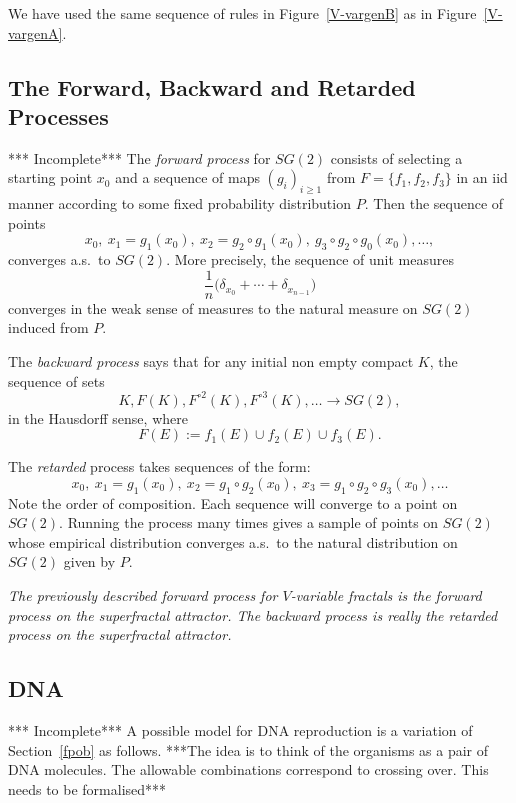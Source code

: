 \documentclass[a4paper]{amsart}
\theoremstyle{plain}
\theoremstyle{definition}
\theoremstyle{remark}
\begin{document}
We have used the same sequence of rules in Figure~\ref{V-vargenB} as in Figure~\ref{V-vargenA}.  

\subsection{The Forward, Backward and Retarded Processes}   *** Incomplete***   The \emph{forward process} for $ SG(2) $ consists of selecting a starting point $ x_0 $ and a sequence of maps $ (g_i)_{i\geq 1} $ from $ F=\{ f_1,f_2,f_3  \} $ in an iid manner according to some fixed probability distribution $ P $.  Then the sequence of points
\[
x_0,\  x_1=g_1(x_0),\  x_2 = g_2\circ g_1(x_0), \  g_3\circ g_2 \circ g_0 (x_0),                   \dots ,
\]
converges a.s.\  to $  SG(2) $.       
More precisely, the sequence of unit measures
\[
\frac{1}{n} \big(\delta_{x_0}+\cdots + \delta_{x_{n-1}}\big)
\]
converges in the weak sense of measures to the natural measure on $ SG(2) $ induced from $ P $.

The \emph{backward process} says that for any initial non empty compact $ K $, the sequence of sets
\[
K, F(K), F^{\circ 2}(K), F^{\circ 3}(K), \dots \to SG(2),\]
in the Hausdorff  sense, where 
\[ F(E) := f_1(E) \cup f_2(E) \cup f_3(E). \]

The \emph{retarded} process takes sequences of the form:
\[
x_0,  \  x_1 = g_1(x_0),\  x_2 = g_1\circ g_2(x_0),\  x_3 = g_1\circ g_2 \circ g_3 (x_0), \dots 
\]
Note the order of composition.  Each sequence will converge to a point on $ SG(2) $.  Running the process many times gives a sample of points on $ SG(2) $ whose empirical distribution converges a.s.\ to the natural distribution on $ SG(2) $ given by $ P $.


\bigskip
\emph{The previously described forward process for $ V $-variable fractals is the forward process on the superfractal attractor.   The backward process is really  the retarded process on the superfractal attractor.}



\subsection{DNA}   *** Incomplete*** A possible model for DNA reproduction is a variation of Section~\ref{fpob} as follows.   ***The idea is to think of the organisms as a pair of DNA molecules.  The allowable combinations correspond to crossing over.  This needs to be formalised***    
\end{document}
